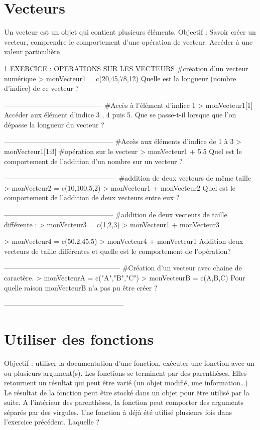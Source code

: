 \section{Vecteurs}
Un vecteur est un objet qui contient plusieurs éléments.
Objectif : Savoir créer un vecteur,  comprendre le comportement d'une opération de vecteur. Accéder à une valeur particulière

1	EXERCICE : OPERATIONS SUR LES VECTEURS
\#création d'un vecteur numérique
> monVecteur1 = c(20,45,78,12)	
Quelle est la longueur (nombre d'indice) de ce vecteur ? 

------------------------------------------
\#Accès à l'élément d'indice 1
> monVecteur1[1]				
Accéder aux élément d'indice  3 , 4 puis 5.
Que se passe-t-il lorsque que l'on dépasse la longueur du vecteur ?

-----------------------------------------------
\#Accès aux éléments d'indice de 1 à 3
> monVecteur1[1:3]			
\#opération sur le vecteur 
> monVecteur1 + 5.5			
Quel est le comportement de l'addition d'un nombre sur un vecteur ?

------------------------------------------------
\#addition de deux vecteurs de même taille
> monVecteur2 = c(10,100,5,2)
> monVecteur1 + monVecteur2		
Quel est le comportement de l'addition de deux vecteurs entre eux ?

-----------------------------------------------
\#addition de deux vecteurs de taille différente :
> monVecteur3 = c(1,2,3) 
> monVecteur1 + monVecteur3
       
> monVecteur4 = c(50.2,45.5)
> monVecteur4 + monVecteur1
Addition deux vecteurs de taille différentes et quelle est le comportement de l'opération?

--------------------------------------------------
\#Création d'un vecteur avec chaine de caractère.
> monVecteurA = c("A","B","C")
> monVecteurB = c(A,B,C)
Pour quelle raison  monVecteurB n'a pas pu être créer ?


---------------------------------------------------



\section{Utiliser des fonctions}
Objectif : utiliser la documentation d'une fonction, exécuter une fonction avec un ou plusieurs argument(s).
Les fonctions se terminent par des parenthèses. Elles retournent un résultat qui peut être varié (un objet modifié, une information…)
Le résultat de la fonction peut être stocké dans un objet pour être utilisé par la suite.
A l'intérieur des parenthèses, la fonction peut comporter des arguments séparés par des virgules.
Une fonction à déjà été utilisé plusieurs fois dans l'exercice précédent. Laquelle ?


